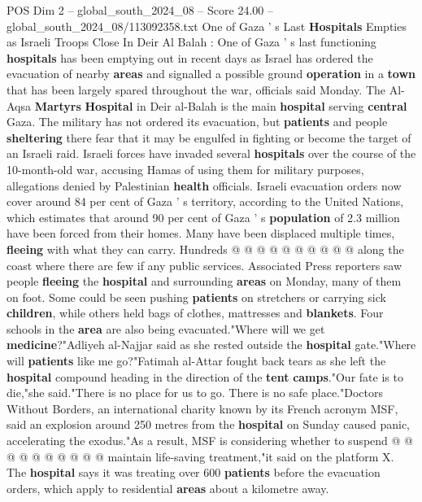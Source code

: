 \begin{textsample}{POS Dim 2 – global\_south\_2024\_08 – Score 24.00 – global\_south\_2024\_08/113092358.txt}  \label{ex:f2_pos_334}
One of Gaza ' s Last \textbf{Hospitals} Empties as Israeli Troops Close In Deir Al Balah : One of Gaza ' s last functioning \textbf{hospitals} has been emptying out in recent days as Israel has ordered the evacuation of nearby \textbf{areas} and signalled a possible ground \textbf{operation} in a \textbf{town} that has been largely spared throughout the war, officials said Monday.
The Al-Aqsa \textbf{Martyrs} \textbf{Hospital} in Deir al-Balah is the main \textbf{hospital} serving \textbf{central} Gaza.
The military has not ordered its evacuation, but \textbf{patients} and people \textbf{sheltering} there fear that it may be engulfed in fighting or become the target of an Israeli raid.
Israeli forces have invaded several \textbf{hospitals} over the course of the 10-month-old war, accusing Hamas of using them for military purposes, allegations denied by Palestinian \textbf{health} officials.
Israeli evacuation orders now cover around 84 per cent of Gaza ' s territory, according to the United Nations, which estimates that around 90 per cent of Gaza ' s \textbf{population} of 2.3 million have been forced from their homes.
Many have been displaced multiple times, \textbf{fleeing} with what they can carry.
Hundreds @ @ @ @ @ @ @ @ @ @ along the coast where there are few if any public services.
Associated Press reporters saw people \textbf{fleeing} the \textbf{hospital} and surrounding \textbf{areas} on Monday, many of them on foot.
Some could be seen pushing \textbf{patients} on stretchers or carrying sick \textbf{children}, while others held bags of clothes, mattresses and \textbf{blankets}.
Four schools in the \textbf{area} are also being evacuated."Where will we get \textbf{medicine}?"Adliyeh al-Najjar said as she rested outside the \textbf{hospital} gate."Where will \textbf{patients} like me go?"Fatimah al-Attar fought back tears as she left the \textbf{hospital} compound heading in the direction of the \textbf{tent} \textbf{camps}."Our fate is to die,"she said."There is no place for us to go.
There is no safe place."Doctors Without Borders, an international charity known by its French acronym MSF, said an explosion around 250 metres from the \textbf{hospital} on Sunday caused panic, accelerating the exodus."As a result, MSF is considering whether to suspend @ @ @ @ @ @ @ @ @ @ maintain life-saving treatment,"it said on the platform X.
The \textbf{hospital} says it was treating over 600 \textbf{patients} before the evacuation orders, which apply to residential \textbf{areas} about a kilometre away.

\end{textsample}
